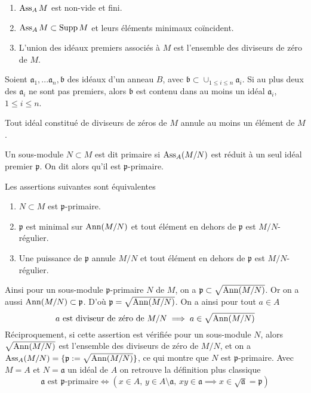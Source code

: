 \begin{prop}\label{AssociatedPrimesProp1}
\begin{enumerate}
\item $\operatorname{Ass}_A M$ est non-vide et fini.
\item $\operatorname{Ass}_A M\subset \operatorname{Supp} M$ et leurs éléments minimaux coïncident.
\item L'union des idéaux premiers associés à $M$ est l'ensemble des diviseurs de zéro de $M$.
\end{enumerate}
\end{prop}

\begin{prop}
Soient $\mathfrak{a}_1,...\mathfrak{a}_n, \mathfrak{b}$ des idéaux d'un anneau $B$, avec $\mathfrak{b}\subset \cup_{1\leq i\leq n}\mathfrak{a}_i$. Si au plus deux des $\mathfrak{a}_i$ ne sont pas premiers, alors $\mathfrak{b}$ est contenu dans au moins un idéal $\mathfrak{a}_i$, $1\leq i\leq n$.
\end{prop}

\begin{cor}\label{AssociatedPrimesProp2}
Tout idéal constitué de diviseurs de zéros de $M$ annule au moins un élément de $M$.
\end{cor}

\begin{defn}
Un sous-module $N\subset M$ est dit primaire si $\operatorname{Ass}_A(M/N)$ est réduit à un seul idéal premier $\mathfrak{p}$. On dit alors qu'il est $\mathfrak{p}$-primaire.
\end{defn}

\begin{prop}
Les assertions suivantes sont équivalentes
\begin{enumerate}
\item $N\subset M$ est $\mathfrak{p}$-primaire.
\item $\mathfrak{p}$ est minimal sur $\operatorname{Ann}(M/N)$ et tout élément en dehors de $\mathfrak{p}$ est $M/N$-régulier.
\item Une puissance de $\mathfrak{p}$ annule $M/N$ et tout élément en dehors de $\mathfrak{p}$ est $M/N$-régulier.
\end{enumerate}
\end{prop}

\begin{rem}
Ainsi pour un sous-module $\mathfrak{p}$-primaire $N$ de $M$, on a $\mathfrak{p}\subset \sqrt{\operatorname{Ann}(M/N)}$. Or on a aussi $\operatorname{Ann}(M/N)\subset \mathfrak{p}$. D'où $\mathfrak{p}=\sqrt{\operatorname{Ann}(M/N)}$. On a ainsi pour tout $a\in A$
$$a\text{ est diviseur de zéro de } M/N \implies a\in\sqrt{\operatorname{Ann}(M/N)}$$
Réciproquement, si cette assertion est vérifiée pour un sous-module $N$, alors $\sqrt{\operatorname{Ann}(M/N)}$ est l'ensemble des diviseurs de zéro de $M/N$, et on a $\operatorname{Ass}_A(M/N)=\lbrace \mathfrak{p}:=\sqrt{\operatorname{Ann}(M/N)}\rbrace$, ce qui montre que $N$ est $\mathfrak{p}$-primaire. Avec $M=A$ et $N=\mathfrak{a}$ un idéal de $A$ on retrouve la définition plus classique
$$\mathfrak{a}\text{ est }\mathfrak{p}\text{-primaire} \iff (x\in A,\, y\in A\setminus\mathfrak{a},\,xy\in\mathfrak{a}\implies x\in \sqrt{\mathfrak{a}}=\mathfrak{p})$$
\end{rem}

